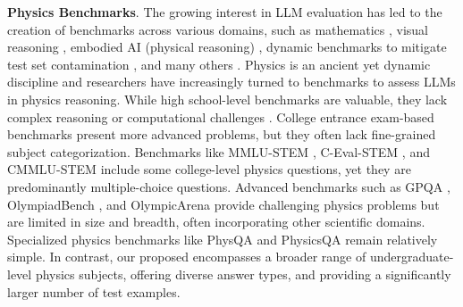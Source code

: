 \textbf{Physics Benchmarks}.
The growing interest in LLM evaluation has led to the creation of benchmarks across various domains, such as mathematics \citep{gsm8k2021cobbe, MATH2021hendrycks, CollegeMath2024Tang, MathBench2024Liu, omnimath2024gao, ugmathbench2025xu}, visual reasoning \citep{geoqa2021chen, geoqa+2022Cao, OlympiadBench2024He, OlympicArena2024huang, MathVista2023lu}, embodied AI (physical reasoning) \citep{piqa2019bisk, phyre2019bakhtin,newton2023wang}, dynamic benchmarks to mitigate test set contamination \citep{MATH_FUNC2024srivastava, GSM1K2024zhang, VarBench2024qian, LiveBench2024white}, and many others \citep{theoremqa2023chen, pds2024xu, rewardbench2024lambert, feabench2024mudur2024,E-GSM2024Xu, processbench2024zheng}.
Physics is an ancient yet dynamic discipline and researchers have increasingly turned to benchmarks to assess LLMs in physics reasoning.
While high school-level benchmarks \citep{sciQ2017welbl, scienceqa2022Lu, E-eval2024hou} are valuable, they lack complex reasoning or computational challenges \citep{OlympiadBench2024He}. 
College entrance exam-based benchmarks \citep{agieval2023zhong, GaokaoBench2023zhang, JEEBench2023Arora} present more advanced problems, but they often lack fine-grained subject categorization. 
Benchmarks like MMLU-STEM \citep{MMLU2020hendrycks}, C-Eval-STEM \citep{c-eval2024huang}, and CMMLU-STEM \citep{cmmlu2023li} include some college-level physics questions, yet they are predominantly multiple-choice questions. 
Advanced benchmarks such as GPQA \citep{gpqa2023rein}, OlympiadBench \citep{OlympiadBench2024He}, and OlympicArena \citep{OlympicArena2024huang} provide challenging physics problems but are limited in size and breadth, often incorporating other scientific domains. 
Specialized physics benchmarks like PhysQA \citep{PhysQA2023Ding} and PhysicsQA \citep{PhysicsQA2024jaiswal} remain relatively simple.
In contrast, our proposed {\benchmark} encompasses a broader range of undergraduate-level physics subjects, offering diverse answer types, and providing a significantly larger number of test examples.

